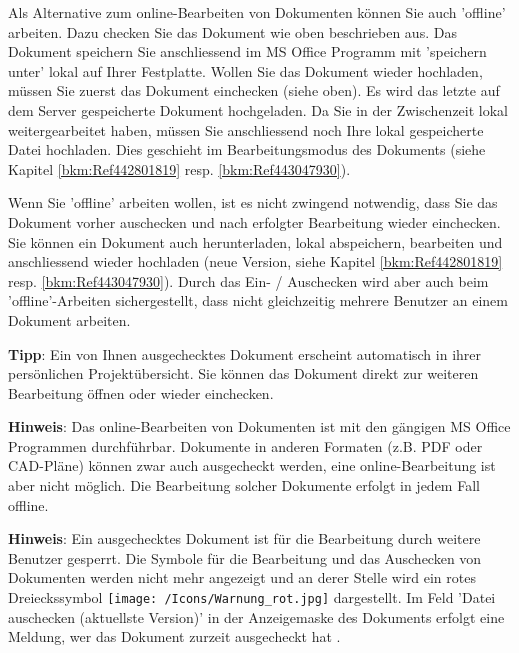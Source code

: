 Als Alternative zum online-Bearbeiten von Dokumenten können Sie auch 'offline' arbeiten. Dazu checken Sie das Dokument wie oben beschrieben aus. Das Dokument speichern Sie anschliessend im MS Office Programm mit 'speichern unter' lokal auf Ihrer Festplatte. Wollen Sie das Dokument wieder hochladen, müssen Sie
zuerst das Dokument einchecken (siehe oben). Es wird das letzte auf dem Server gespeicherte Dokument hochgeladen. Da Sie in der Zwischenzeit lokal weitergearbeitet haben, müssen Sie anschliessend noch Ihre lokal gespeicherte Datei hochladen. Dies geschieht im Bearbeitungsmodus des Dokuments (siehe Kapitel \ref{bkm:Ref442801819} resp. \ref{bkm:Ref443047930}). \newline

Wenn Sie 'offline' arbeiten wollen, ist es nicht zwingend notwendig, dass Sie das Dokument vorher auschecken und nach erfolgter Bearbeitung wieder einchecken. Sie können ein Dokument auch herunterladen, lokal abspeichern, bearbeiten und anschliessend wieder hochladen (neue Version, siehe Kapitel \ref{bkm:Ref442801819} resp. \ref{bkm:Ref443047930}). Durch das Ein- / Auschecken wird aber auch beim 'offline'-Arbeiten sichergestellt, dass nicht gleichzeitig mehrere Benutzer an einem Dokument arbeiten. 

\vspace{\baselineskip}

\textbf{Tipp}: Ein von Ihnen ausgechecktes Dokument erscheint automatisch in ihrer persönlichen Projektübersicht. Sie können das Dokument direkt zur weiteren Bearbeitung öffnen oder wieder einchecken. \newline


\textbf{Hinweis}: Das online-Bearbeiten von Dokumenten ist mit den gängigen MS Office Programmen durchführbar. Dokumente in anderen Formaten (z.B. PDF oder CAD-Pläne) können zwar auch ausgecheckt werden, eine online-Bearbeitung ist aber nicht möglich. Die Bearbeitung solcher Dokumente erfolgt in jedem Fall offline. \newline


\textbf{Hinweis}: Ein ausgechecktes Dokument ist für die Bearbeitung durch weitere Benutzer gesperrt. Die Symbole für die Bearbeitung und das Auschecken von Dokumenten werden nicht mehr angezeigt und an derer Stelle wird ein rotes Dreieckssymbol \texttt{[image: /Icons/Warnung\_rot.jpg]}  dargestellt. Im Feld 'Datei auschecken (aktuellste Version)' in der Anzeigemaske des Dokuments erfolgt eine Meldung, wer das Dokument zurzeit ausgecheckt hat .

